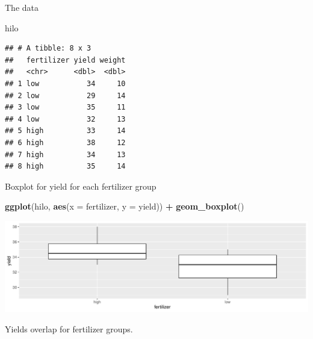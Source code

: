\documentclass[
  ignorenonframetext,
]{beamer}
\newenvironment{Shaded}{\begin{snugshade}}{\end{snugshade}}
\newcommand{\DataTypeTok}[1]{\textcolor[rgb]{0.13,0.29,0.53}{#1}}
\newcommand{\KeywordTok}[1]{\textcolor[rgb]{0.13,0.29,0.53}{\textbf{#1}}}
\newcommand{\NormalTok}[1]{#1}
\newcommand{\OperatorTok}[1]{\textcolor[rgb]{0.81,0.36,0.00}{\textbf{#1}}}
\newcommand{\StringTok}[1]{\textcolor[rgb]{0.31,0.60,0.02}{#1}}
\begin{document}
\begin{frame}[fragile]{The data}
\protect\hypertarget{the-data-9}{}

\begin{Shaded}
\begin{Highlighting}[]
\NormalTok{hilo}
\end{Highlighting}
\end{Shaded}

\begin{verbatim}
## # A tibble: 8 x 3
##   fertilizer yield weight
##   <chr>      <dbl>  <dbl>
## 1 low           34     10
## 2 low           29     14
## 3 low           35     11
## 4 low           32     13
## 5 high          33     14
## 6 high          38     12
## 7 high          34     13
## 8 high          35     14
\end{verbatim}

\end{frame}

\begin{frame}[fragile]{Boxplot for yield for each fertilizer group}
\protect\hypertarget{boxplot-for-yield-for-each-fertilizer-group}{}

\begin{Shaded}
\begin{Highlighting}[]
\KeywordTok{ggplot}\NormalTok{(hilo, }\KeywordTok{aes}\NormalTok{(}\DataTypeTok{x =}\NormalTok{ fertilizer, }\DataTypeTok{y =}\NormalTok{ yield)) }\OperatorTok{+}\StringTok{ }\KeywordTok{geom_boxplot}\NormalTok{()}
\end{Highlighting}
\end{Shaded}

\includegraphics{slides_d29_files/figure-beamer/ferto-1.pdf}

Yields overlap for fertilizer groups.

\end{frame}
\end{document}
